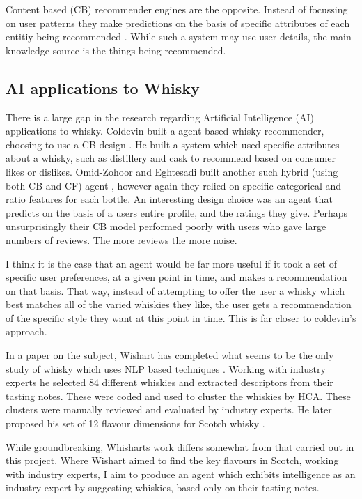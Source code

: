 Content based (CB) recommender engines are the opposite.  Instead of focussing on user patterns they make predictions
on the basis of specific attributes of each entitiy being recommended \cite{Melville2010, Mooney2000}.  While such a 
system may use user details, the main knowledge source is the things being recommended.

\subsection{AI applications to Whisky}\label{ssec:ml2whisk}

There is a large gap in the research regarding Artificial Intelligence (AI) applications to whisky.
Coldevin built a agent based whisky recommender, choosing to use a CB design \cite{Coldevin2005}.  He 
built a system which used specific attributes about a whisky, such as distillery and cask to recommend based
on consumer likes or dislikes. Omid-Zohoor and Eghtesadi built another such hybrid (using both CB and CF) 
agent \cite{Omidzohoor}, however again they relied on specific categorical and ratio features for each bottle.
An interesting design choice was an agent that predicts on the basis of a users entire profile, and the 
ratings they give.  Perhaps unsurprisingly their CB model performed poorly with users who gave large 
numbers of reviews. The more reviews the more noise.

I think it is the case that an agent would be far more useful if it took a set of specific user preferences,
at a given point in time, and makes a recommendation on that basis.  That way, instead of attempting
to offer the user a whisky which best matches all of the varied whiskies they like, the user gets
a recommendation of the specific style they want at this point in time.  This is far 
closer to coldevin's approach.

In a paper on the subject, Wishart has completed what seems to be the only study of whisky which uses NLP based techniques \cite{Wishart2000}.
Working with industry experts he selected 84 different whiskies and extracted descriptors from their tasting notes. 
These were coded and used to cluster the whiskies by HCA. These clusters were manually reviewed and evaluated by 
industry experts.  He later proposed his set of 12 flavour dimensions for Scotch whisky \cite{Wishart2009}.

While groundbreaking, Whisharts work differs somewhat from that carried out in this project.  Where Wishart aimed to find
the key flavours in Scotch, working with industry experts, I aim to produce an agent which exhibits intelligence as an 
industry expert by suggesting whiskies, based only on their tasting notes.

